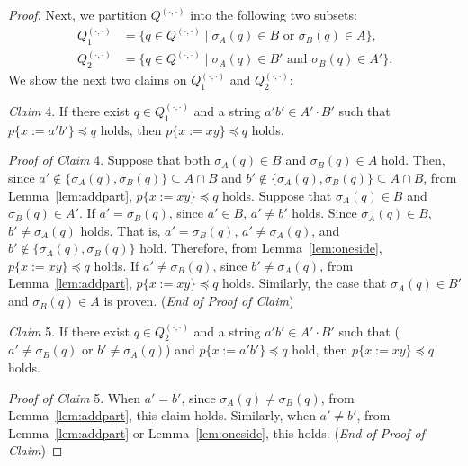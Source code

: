 \begin{proof}
Next, we partition $Q^{(\cdot,\cdot)}$ into the following two subsets:
\begin{align*}
  Q_{1}^{(\cdot,\cdot)} & = \{q \in Q^{(\cdot,\cdot)} \mid \sigma_{A}(q) \in B \mbox{ or } \sigma_{B}(q) \in A\},\\
  Q_{2}^{(\cdot,\cdot)} & = \{q \in Q^{(\cdot,\cdot)} \mid \sigma_{A}(q) \in B' \mbox{ and } \sigma_{B}(q) \in A'\}.
\end{align*}
We show the next two claims on $Q_{1}^{(\cdot,\cdot)}$ and $Q_{2}^{(\cdot,\cdot)}$:

\smallskip

\noindent
\textit{Claim} 4.
If there exist $q \in Q_{1}^{(\cdot,\cdot)}$ and a string $a'b' \in A'\cdot B'$ such that $p\{x:=a'b'\} \preceq q$ holds, then $p\{x:=xy\} \preceq q$ holds.

\smallskip

\noindent
\textit{Proof of Claim} 4.
Suppose that both $\sigma_{A}(q) \in B$ and $\sigma_{B}(q) \in A$ hold. Then, since $a' \not\in \{\sigma_{A}(q), \sigma_{B}(q)\} \subseteq A\cap B$ and $b' \not\in \{\sigma_{A}(q), \sigma_{B}(q)\} \subseteq A\cap B$, from Lemma~\ref{lem:addpart}, $p\{x:=xy\} \preceq q$ holds.
Suppose that $\sigma_{A}(q)\in B$ and $\sigma_{B}(q)\in A'$.
If $a' = \sigma_{B}(q)$, since $a' \in B$, $a' \not= b'$ holds.
Since $\sigma_{A}(q)\in B$, $b' \not= \sigma_{A}(q)$ holds.
That is, $a' = \sigma_{B}(q)$, $a' \not= \sigma_{A}(q)$, and $b' \not\in \{\sigma_{A}(q), \sigma_{B}(q)\}$ hold.
Therefore, from Lemma~\ref{lem:oneside}, $p\{x:=xy\} \preceq q$ holds.
If $a' \not= \sigma_{B}(q)$, since $b' \not= \sigma_{A}(q)$, from Lemma~\ref{lem:addpart}, $p\{x:=xy\} \preceq q$ holds.
Similarly, the case that $\sigma_{A}(q)\in B'$ and $\sigma_{B}(q)\in A$ is proven. (\textit{End of Proof of Claim})

\smallskip

\noindent
\textit{Claim} 5.
If there exist $q \in Q_{2}^{(\cdot,\cdot)}$ and a string $a'b' \in A'\cdot B'$ such that ($a' \not= \sigma_{B}(q)$ or $b' \not= \sigma_{A}(q)$) and $p\{x:=a'b'\} \preceq q$ hold, then $p\{x:=xy\} \preceq q$ holds.
 
\smallskip

\noindent
\textit{Proof of Claim} 5.
When $a'=b'$, since $\sigma_{A}(q) \not= \sigma_{B}(q)$, from Lemma~\ref{lem:addpart}, this claim holds. Similarly, when $a' \not = b'$, from Lemma~\ref{lem:addpart} or Lemma~\ref{lem:oneside}, this holds.  (\textit{End of Proof of Claim})
  
\smallskip


\end{proof}
